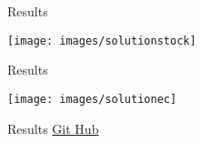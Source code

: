 \begin{frame}{Results}
    \begin{center}
    \texttt{[image: images/solutionstock]}
    \end{center}
\end{frame}

\begin{frame}{Results}
    \begin{center}
    \texttt{[image: images/solutionec]}
    \end{center}
\end{frame}
\begin{frame}{Results}
    \href{https://github.com/SaulDiazInfante/Beamer-xxxii-semana-unison-2022-ProbabilityWorkshop.git}{Git Hub}
    \begin{center}
    \end{center}
\end{frame}
